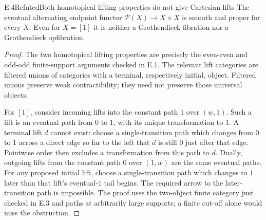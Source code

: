 \begin{result}{E.4}{Refuted}{Both homotopical lifting properties do not give Cartesian lifts}
The eventual alternating endpoint functor $\mathcal P(X)\to X\times X$ is smooth and proper for every $X$. Even for $X=[1]$ it is neither a Grothendieck fibration nor a Grothendieck opfibration.
\end{result}
\begin{proof}
The two homotopical lifting properties are precisely the even-even and odd-odd finite-support arguments checked in E.1. The relevant lift categories are filtered unions of categories with a terminal, respectively initial, object. Filtered unions preserve weak contractibility; they need not preserve those universal objects.

For $[1]$, consider incoming lifts into the constant path $1$ over $(w,1)$. Such a lift is an eventual path from $0$ to $1$, with its unique transformation to $1$. A terminal lift $d$ cannot exist: choose a single-transition path which changes from $0$ to $1$ across a direct edge so far to the left that $d$ is still $0$ just after that edge. Pointwise order then excludes a transformation from this path to $d$. Dually, outgoing lifts from the constant path $0$ over $(1,w)$ are the same eventual paths. For any proposed initial lift, choose a single-transition path which changes to $1$ later than that lift's eventual-$1$ tail begins. The required arrow to the later-transition path is impossible. The proof uses the two-object finite category just checked in E.3 and paths at arbitrarily large supports; a finite cut-off alone would miss the obstruction.
\end{proof}

